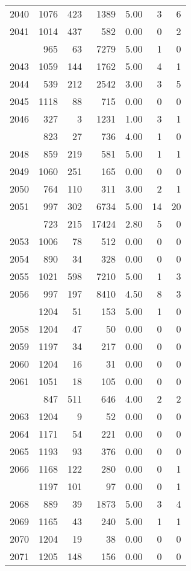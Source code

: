 \documentclass[
]{article}
\begin{document}
\begin{table}
\begin{tabular}[t]{lrrrrrr}
2040 & 1076 & 423 & 1389 & 5.00 & 3 & 6\\
2041 & 1014 & 437 & 582 & 0.00 & 0 & 2\\
\addlinespace
2042 & 965 & 63 & 7279 & 5.00 & 1 & 0\\
2043 & 1059 & 144 & 1762 & 5.00 & 4 & 1\\
2044 & 539 & 212 & 2542 & 3.00 & 3 & 5\\
2045 & 1118 & 88 & 715 & 0.00 & 0 & 0\\
2046 & 327 & 3 & 1231 & 1.00 & 3 & 1\\
\addlinespace
2047 & 823 & 27 & 736 & 4.00 & 1 & 0\\
2048 & 859 & 219 & 581 & 5.00 & 1 & 1\\
2049 & 1060 & 251 & 165 & 0.00 & 0 & 0\\
2050 & 764 & 110 & 311 & 3.00 & 2 & 1\\
2051 & 997 & 302 & 6734 & 5.00 & 14 & 20\\
\addlinespace
2052 & 723 & 215 & 17424 & 2.80 & 5 & 0\\
2053 & 1006 & 78 & 512 & 0.00 & 0 & 0\\
2054 & 890 & 34 & 328 & 0.00 & 0 & 0\\
2055 & 1021 & 598 & 7210 & 5.00 & 1 & 3\\
2056 & 997 & 197 & 8410 & 4.50 & 8 & 3\\
\addlinespace
2057 & 1204 & 51 & 153 & 5.00 & 1 & 0\\
2058 & 1204 & 47 & 50 & 0.00 & 0 & 0\\
2059 & 1197 & 34 & 217 & 0.00 & 0 & 0\\
2060 & 1204 & 16 & 31 & 0.00 & 0 & 0\\
2061 & 1051 & 18 & 105 & 0.00 & 0 & 0\\
\addlinespace
2062 & 847 & 511 & 646 & 4.00 & 2 & 2\\
2063 & 1204 & 9 & 52 & 0.00 & 0 & 0\\
2064 & 1171 & 54 & 221 & 0.00 & 0 & 0\\
2065 & 1193 & 93 & 376 & 0.00 & 0 & 0\\
2066 & 1168 & 122 & 280 & 0.00 & 0 & 1\\
\addlinespace
2067 & 1197 & 101 & 97 & 0.00 & 0 & 1\\
2068 & 889 & 39 & 1873 & 5.00 & 3 & 4\\
2069 & 1165 & 43 & 240 & 5.00 & 1 & 1\\
2070 & 1204 & 19 & 38 & 0.00 & 0 & 0\\
2071 & 1205 & 148 & 156 & 0.00 & 0 & 0\\

\end{tabular}
\end{table}
\end{document}
